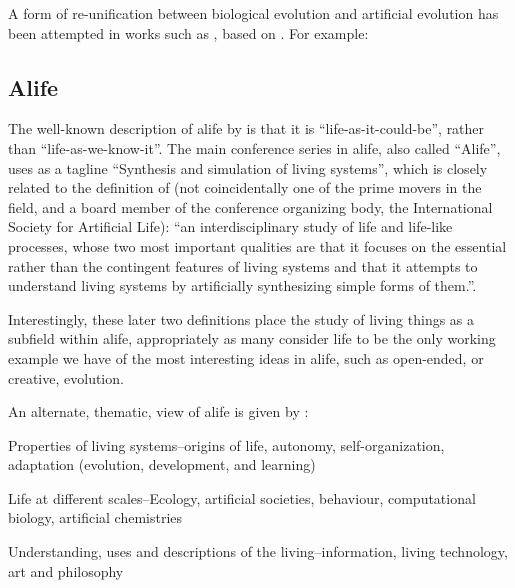 A form of re-unification between biological evolution and artificial evolution has been attempted in works such as \parencite{Paixao2015}, based on . For example: 

\subsection{Alife}\label{alife}
The well-known description of \gls{alife} by \cite{Langton1989} is that it is ``life-as-it-could-be'', rather than ``life-as-we-know-it''. The main conference series in \gls{alife}, also called ``Alife'', uses as a tagline ``Synthesis and simulation of living systems'', which is closely related to the definition of \cite{Bedau:2007ga} (not coincidentally one of the prime movers in the field, and a board member of the conference organizing body, the International Society for Artificial Life): ``an interdisciplinary study of life and life-like processes, whose two most important qualities are that it focuses on the essential rather than the contingent features of living systems and that it attempts to understand living systems by artificially synthesizing simple forms of them.''. 

Interestingly, these later two definitions place the study of living things as a subfield within \gls{alife}, appropriately as many consider life to be the only working example we have of the most interesting ideas in \gls{alife}, such as open-ended, or creative, evolution.

An alternate, thematic, view of \gls{alife} is given by \cite{Aguilar2014}:
\begin{compactitem}
\item Properties of living systems--origins of life, autonomy, self-organization, adaptation (evolution, development, and learning)
\item Life at different scales--Ecology, artificial societies, behaviour, computational biology, artificial chemistries
\item Understanding, uses and descriptions of the living--information, living technology, art and philosophy
\end{compactitem}

